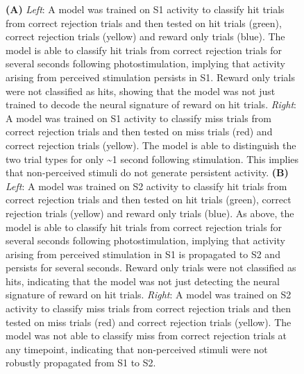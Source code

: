 \begin{figure}[!h]
{\textbf{(A)} \textit{Left}: A model was trained on S1 activity to classify hit trials from correct rejection trials and then tested on hit trials (green), correct rejection trials (yellow) and reward only trials (blue). The model is able to classify hit trials from correct rejection trials for several seconds following photostimulation, implying that activity arising from perceived stimulation persists in S1. Reward only trials were not classified as hits, showing that the model was not just trained to decode the neural signature of reward on hit trials. \textit{Right}: A model was trained on S1 activity to classify miss trials from correct rejection trials and then tested on miss trials (red) and correct rejection trials (yellow). The model is able to distinguish the two trial types for only \textasciitilde1 second following stimulation. This implies that non-perceived stimuli do not generate persistent activity. \textbf{(B)} \textit{Left}: A model was trained on S2 activity to classify hit trials from correct rejection trials and then tested on hit trials (green), correct rejection trials (yellow) and reward only trials (blue). As above, the model is able to classify hit trials from correct rejection trials for several seconds following photostimulation, implying that activity arising from perceived stimulation in S1 is propagated to S2 and persists for several seconds. Reward only trials were not classified as hits, indicating that the model was not just detecting the neural signature of reward on hit trials. \textit{Right}: A model was trained on S2 activity to classify miss trials from correct rejection trials and then tested on miss trials (red) and correct rejection trials (yellow). The model was not able to classify miss from correct rejection trials at any timepoint, indicating that non-perceived stimuli were not robustly propagated from S1 to S2.
} 
\label{fig:fig3}
\end{figure}

